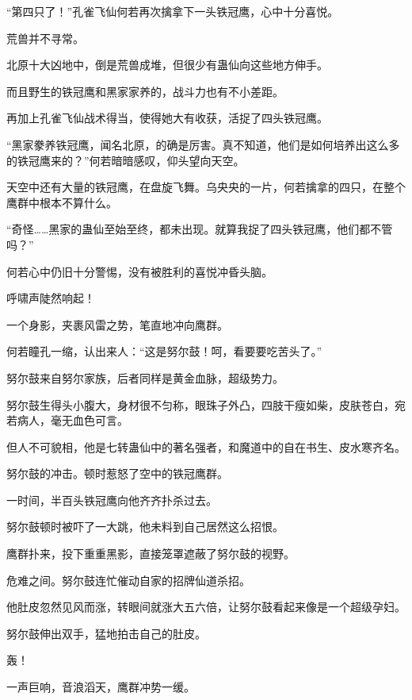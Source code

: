 
\begin{this_body}



“第四只了！”孔雀飞仙何若再次擒拿下一头铁冠鹰，心中十分喜悦。

荒兽并不寻常。

北原十大凶地中，倒是荒兽成堆，但很少有蛊仙向这些地方伸手。

而且野生的铁冠鹰和黑家家养的，战斗力也有不小差距。

再加上孔雀飞仙战术得当，使得她大有收获，活捉了四头铁冠鹰。

“黑家豢养铁冠鹰，闻名北原，的确是厉害。真不知道，他们是如何培养出这么多的铁冠鹰来的？”何若暗暗感叹，仰头望向天空。

天空中还有大量的铁冠鹰，在盘旋飞舞。乌央央的一片，何若擒拿的四只，在整个鹰群中根本不算什么。

“奇怪……黑家的蛊仙至始至终，都未出现。就算我捉了四头铁冠鹰，他们都不管吗？”

何若心中仍旧十分警惕，没有被胜利的喜悦冲昏头脑。

呼啸声陡然响起！

一个身影，夹裹风雷之势，笔直地冲向鹰群。

何若瞳孔一缩，认出来人：“这是努尔鼓！呵，看要要吃苦头了。”

努尔鼓来自努尔家族，后者同样是黄金血脉，超级势力。

努尔鼓生得头小腹大，身材很不匀称，眼珠子外凸，四肢干瘦如柴，皮肤苍白，宛若病人，毫无血色可言。

但人不可貌相，他是七转蛊仙中的著名强者，和魔道中的自在书生、皮水寒齐名。

努尔鼓的冲击。顿时惹怒了空中的铁冠鹰群。

一时间，半百头铁冠鹰向他齐齐扑杀过去。

努尔鼓顿时被吓了一大跳，他未料到自己居然这么招恨。

鹰群扑来，投下重重黑影，直接笼罩遮蔽了努尔鼓的视野。

危难之间。努尔鼓连忙催动自家的招牌仙道杀招。

他肚皮忽然见风而涨，转眼间就涨大五六倍，让努尔鼓看起来像是一个超级孕妇。

努尔鼓伸出双手，猛地拍击自己的肚皮。

轰！

一声巨响，音浪滔天，鹰群冲势一缓。


\end{this_body}

